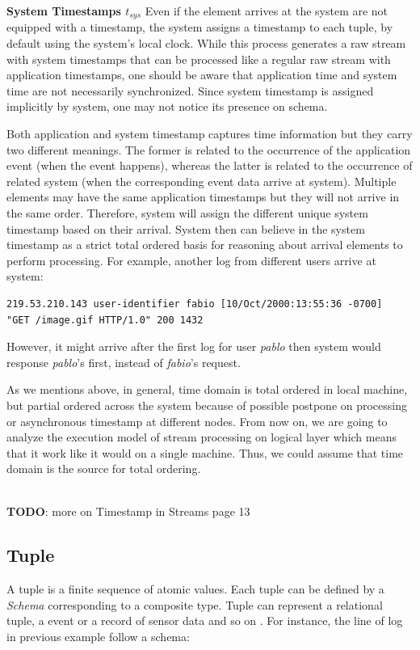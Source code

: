 \textbf{System Timestamps $t_{sys}$} Even if the element arrives at the system are not equipped with a timestamp, the system assigns a timestamp to each tuple, by default using the system’s local clock. While this process generates a raw stream with system timestamps that can be processed like a regular raw stream with application timestamps, one should be aware that application time and system time are not necessarily synchronized\citep{Kramer:2009}. Since system timestamp is assigned implicitly by system, one may not notice its presence on schema. 


Both application and system timestamp captures time information but they carry two different meanings. The former is related to the occurrence of the application event (when the event happens), whereas the latter is related to the occurrence of related system (when the corresponding event data arrive at system). Multiple elements may have the same application timestamps but they will not arrive in the same order. Therefore, system will assign the different unique system timestamp based on their arrival. System then can believe in the system timestamp as a strict total ordered basis for reasoning about arrival elements to perform processing. For example, another log from different users arrive at system:
\begin{verbatim}
219.53.210.143 user-identifier fabio [10/Oct/2000:13:55:36 -0700] 
"GET /image.gif HTTP/1.0" 200 1432
\end{verbatim}
However, it might arrive after the first log for user \textit{pablo} then system would response \textit{pablo}'s first, instead of \textit{fabio}'s request.

As we mentions above, in general, time domain is total ordered in local machine, but partial ordered across the system because of possible postpone on processing or asynchronous timestamp at different nodes. From now on, we are going to analyze the execution model of stream processing on logical layer which means that it work like it would on a single machine. Thus, we could assume that time domain is the source for total ordering.

\textbf{\\TODO}: more on Timestamp in Streams \citep{Babcock:2002} page 13

\subsection*{Tuple}
A tuple is a finite sequence of atomic values. Each tuple can be defined by a \textit{Schema} corresponding to a composite type. Tuple can represent a relational tuple, a event or a record of sensor data and so on \citep{Arasu:2006}. For instance, the line of log in previous example follow a schema:

